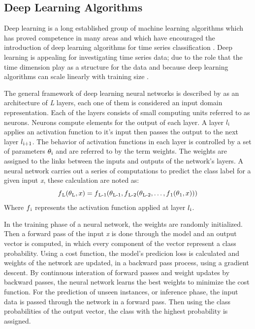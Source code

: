 \subsection{Deep Learning Algorithms}
\label{SubsectionDL}
Deep learning is a long established group of machine learning algorithms which has proved competence in many areas \cite{lecun2015deep}
and which have encouraged the introduction of deep learning algorithms for time series classification \cite{wang2017time}.
Deep learning is appealing for investigating time series data; due to the role that the time dimension play as a structure for the data
and because deep learning algorithms can scale linearly with training size \cite{shifaz2020ts}.

The general framework of deep learning neural networks is described by \cite{fawaz2019deepreview} as an architecture of \emph{L} layers, each one of them is considered an input domain representation.
Each of the layers consists of small computing units referred to as neurons. Neurons compute elements for the output of each layer.
A layer $l\textsubscript{i}$ applies an activation function to it's input then passes the output to the next layer $l\textsubscript{i+1}$.
The behavior of activation functions in each layer is controlled by a set of parameters $\theta\textsubscript{i}$ and are referred to by the term weights.
The weights are assigned to the links between the inputs and outputs of the network's layers. A neural network carries out a series of computations to predict the class label for a given input \emph{x},
these calculation are noted as:
\begin{equation}
    f\textsubscript{L}(\theta\textsubscript{L},x) = f\textsubscript{L-1}(\theta\textsubscript{L-1},f\textsubscript{L-2}(\theta\textsubscript{L-2},\ldots,f\textsubscript{1}(\theta\textsubscript{1},x)))
\end{equation}
Where $f\textsubscript{i}$ represents the activation function applied at layer $l\textsubscript{i}$.

In the training phase of a neural network, the weights are randomly initialized. Then a forward pass of the input \emph{x} is done through the model and an output vector is computed,
in which every component of the vector represent a class probability. Using a cost function, the model's predicion loss is calculated
and weights of the network are updated, in a backward pass process, using a gradient descent.
By continuous interation of forward passes and weight updates by backward passes, the neural network learns the best weights to minimize the cost function.
For the prediction of unseen instances, or inference phase, the input data is passed through the network in a forward pass.
Then using the class probabilities of the output vector, the class with the highest probability is assigned.

